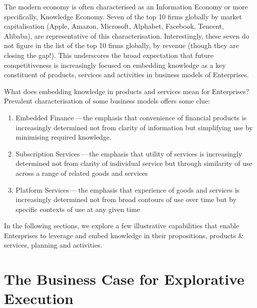 
The modern economy is often characterised as an Information Economy or more specifically,
Knowledge Economy.
Seven of the top 10 firms globally by market capitalisation (Apple, Amazon,
Microsoft, Alphabet,
Facebook, Tencent, Alibaba),
are representative of this characterisation.
Interestingly, these seven do not figure in the list of the top 10 firms globally,
by revenue (though they are closing the gap!).
This underscores the broad expectation that future competitiveness is increasingly focused on embedding knowledge
as a key constituent of products, services and activities in business models of Enterprises.

What does embedding knowledge in products and services mean for Enterprises?
Prevalent characterisation of some business models offers some clue:
\begin{enumerate}[label=(\alph*)]
    \item Embedded Finance\,---\,the emphasis that convenience of financial products is increasingly determined not
          from clarity of information but simplifying use by minimising required knowledge.
    \item Subscription Services\,---\,the emphasis that utility of services is increasingly determined not from
          clarity of individual service but through similarity of use across a range of related goods and services
    \item Platform Services\,---\,the emphasis that experience of goods and services is increasingly determined not
          from broad contours of use over time but by specific contexts of use at any given time
\end{enumerate}

In the following sections, we explore a few illustrative capabilities that enable Enterprises to leverage and embed
knowledge in their propositions, products \& services, planning and activities.

\section*{The Business Case for Explorative Execution}

